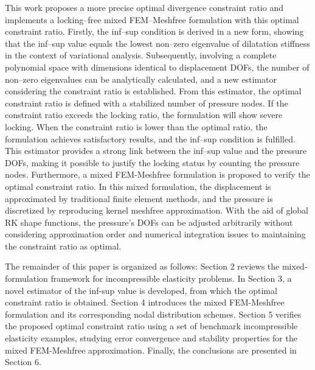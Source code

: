 This work proposes a more precise optimal divergence constraint ratio and implements a locking--free mixed FEM--Meshfree formulation with this optimal constraint ratio.
Firstly, the inf--sup condition is derived in a new form, showing that the inf--sup value equals the lowest non--zero eigenvalue of dilatation stiffness in the context of variational analysis.
Subsequently, involving a complete polynomial space with dimensions identical to displacement DOFs, the number of non--zero eigenvalues can be analytically calculated,
and a new estimator considering the constraint ratio is established.
From this estimator, the optimal constraint ratio is defined with a stabilized number of pressure nodes.
If the constraint ratio exceeds the locking ratio, the formulation will show severe locking.
When the constraint ratio is lower than the optimal ratio, the formulation achieves satisfactory results, and the inf--sup condition is fulfilled.
This estimator provides a strong link between the inf--sup value and the pressure DOFs, making it possible to justify the locking status by counting the pressure nodes.
Furthermore, a mixed FEM-Meshfree formulation is proposed to verify the optimal constraint ratio.
In this mixed formulation, the displacement is approximated by traditional finite element methods, and the pressure is discretized by reproducing kernel meshfree approximation.
With the aid of global RK shape functions, the pressure's DOFs can be adjusted arbitrarily without considering approximation order and numerical integration issues to maintaining the constraint ratio as optimal.

The remainder of this paper is organized as follows:
Section 2 reviews the mixed-formulation framework for incompressible elasticity problems.
In Section 3, a novel estimator of the inf-sup value is developed, from which the optimal constraint ratio is obtained.
Section 4 introduces the mixed FEM-Meshfree formulation and its corresponding nodal distribution schemes.
Section 5 verifies the proposed optimal constraint ratio using a set of benchmark incompressible elasticity examples, studying error convergence and stability properties for the mixed FEM-Meshfree approximation. Finally, the conclusions are presented in Section 6.
